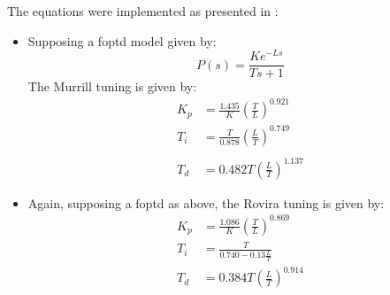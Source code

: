 The equations were implemented as presented in \citet{odwyer2006}:
\begin{itemize}
	\item Supposing a \gls{foptd} model given by:
			\begin{equation*}
				P(s) = \frac{K e^{-L s}}{Ts+1}
			\end{equation*}
			The Murrill tuning is given by:
				\begin{align*}
					K_p &= \frac{1.435}{K}\left( \frac{T}{L} \right)^{0.921}\\
					T_i &= \frac{T}{0.878}\left( \frac{L}{T}\right)^{0.749}\\\\
					T_d &= 0.482 T \left( \frac{L}{T} \right)^{1.137}
				\end{align*}
	\item Again, supposing a \gls{foptd} as above, the Rovira tuning is given by:
			\begin{align*}
				K_p &= \frac{1.086}{K} \left( \frac{T}{L}\right) ^{0.869} \\
				T_i &= \frac{T}{0.740 - 0.13\frac{L}{T}} \\
				T_d &= 0.384 T \left( \frac{L}{T}\right)^{0.914} 
			\end{align*}
\end{itemize}


